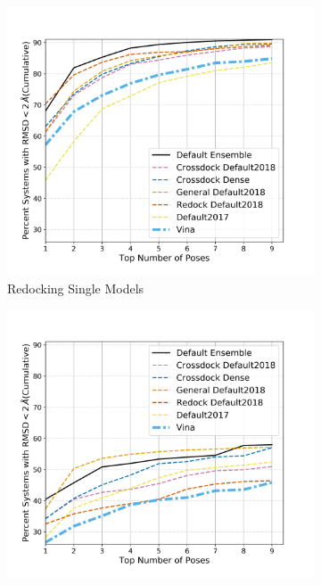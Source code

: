 \documentclass[journal=jcisd8,manuscript=article]{achemso}
\begin{document}
\begin{figure}    
        \begin{subfigure}[b]{0.48\textwidth}    
		\centering
		\includegraphics[width=\textwidth]{figures/redocking/single_models_no2017_nocd2020_line.png}
		\caption{Redocking Single Models}
		\label{fig:No2017NoCD20SingleRD}
        \end{subfigure}    
        \begin{subfigure}[b]{0.48\textwidth}    
		\centering
		\includegraphics[width=\textwidth]{figures/crossdocking/single_models_no2017_nocd2020_line.png}

\end{subfigure}
\end{figure}
\end{document}
